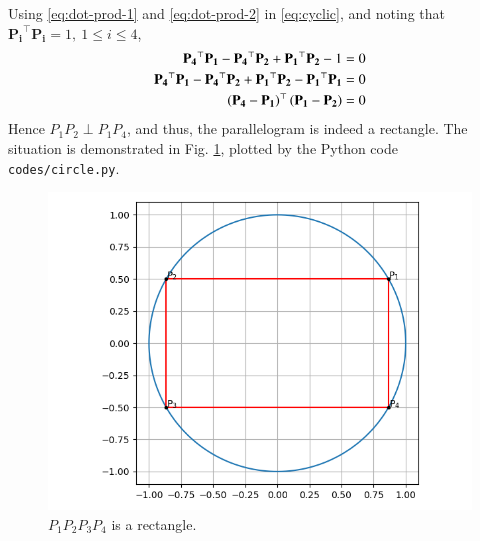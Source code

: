 \documentclass[journal,12pt,twocolumn]{IEEEtran}
\renewcommand{\vec}[1]{\boldsymbol{\mathbf{#1}}}
\begin{document}
\begin{enumerate}
    Using \eqref{eq:dot-prod-1} and \eqref{eq:dot-prod-2} in \eqref{eq:cyclic}, 
    and noting that $\vec{P_i}^\top\vec{P_i} = 1,\ 1 \le i \le 4$,
    \begin{align}
        \vec{P_4}^\top\vec{P_1}-\vec{P_4}^\top\vec{P_2}+\vec{P_1}^\top\vec{P_2}-1 &= 0 \\
        \vec{P_4}^\top\vec{P_1}-\vec{P_4}^\top\vec{P_2}+\vec{P_1}^\top\vec{P_2}-\vec{P_1}^\top\vec{P_1} &= 0 \\
        \brak{\vec{P_4}-\vec{P_1}}^\top\brak{\vec{P_1}-\vec{P_2}} &= 0
        \label{eq:ortho}
    \end{align}
    Hence $P_1P_2 \perp P_1P_4$, and thus, the parallelogram is indeed a rectangle.
    The situation is demonstrated in Fig. \ref{fig:circle}, plotted by the Python
    code \texttt{codes/circle.py}.
    \begin{figure}[!ht]
        \centering
        \includegraphics[width=\columnwidth]{figs/circle.png}
        \caption{$P_1P_2P_3P_4$ is a rectangle.}
        \label{fig:circle}
    \end{figure}
\end{enumerate}
\end{document}
